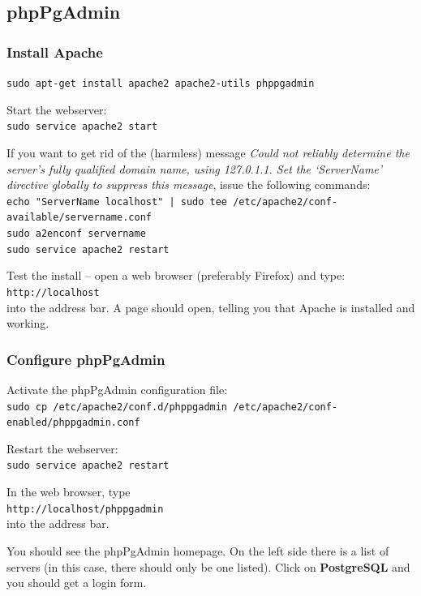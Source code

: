 \subsection{phpPgAdmin}

\subsubsection{Install Apache}
\label{ss:apache}

\verb|sudo apt-get install apache2 apache2-utils phppgadmin|

Start the webserver:\\
\verb|sudo service apache2 start|

If you want to get rid of the (harmless) message \textit{Could not reliably determine the server's fully qualified domain name, using 127.0.1.1. Set the `ServerName' directive globally to suppress this message}, issue the following commands:\\
\verb+echo "ServerName localhost" | sudo tee /etc/apache2/conf-available/servername.conf+\\
\verb|sudo a2enconf servername|\\
\verb|sudo service apache2 restart|

Test the install -- open a web browser (preferably Firefox) and type:\\
\verb|http://localhost|\\
into the address bar. A page should open, telling you that Apache is installed and working.

\subsubsection{Configure phpPgAdmin}

Activate the phpPgAdmin configuration file:\\
\verb|sudo cp /etc/apache2/conf.d/phppgadmin /etc/apache2/conf-enabled/phppgadmin.conf|

Restart the webserver:\\
\verb|sudo service apache2 restart|

In the web browser, type\\
\verb|http://localhost/phppgadmin|\\
into the address bar.

You should see the phpPgAdmin homepage. On the left side there is a list of servers (in this case, there should only be one listed). Click on \textbf{PostgreSQL} and you should get a login form.

